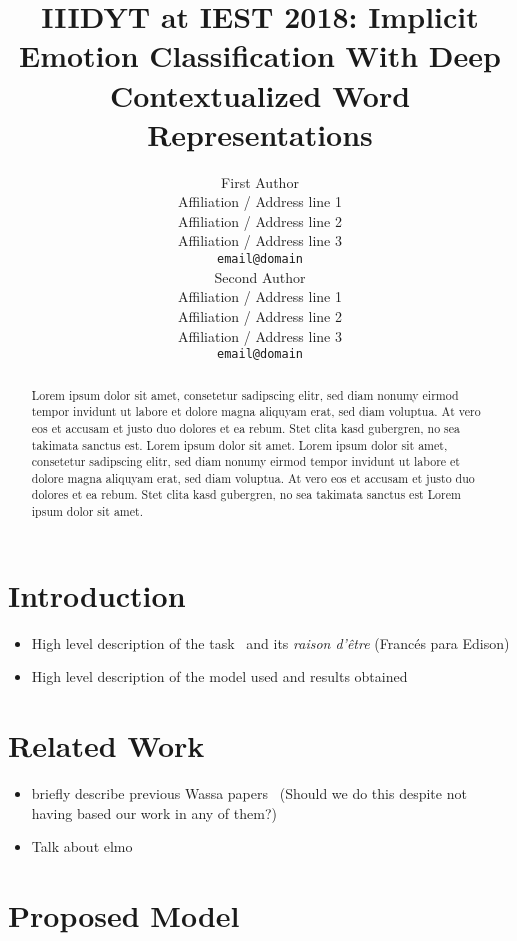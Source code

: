 \documentclass[11pt,a4paper]{article}
\title{IIIDYT at IEST 2018: Implicit Emotion Classification With Deep
Contextualized Word Representations}
\author{First Author \\
  Affiliation / Address line 1 \\
  Affiliation / Address line 2 \\
  Affiliation / Address line 3 \\
  {\tt email@domain} \\
  \And{}
  Second Author \\
  Affiliation / Address line 1 \\
  Affiliation / Address line 2 \\
  Affiliation / Address line 3 \\
  {\tt email@domain} \\}
\date{}
\begin{document}
\maketitle
\begin{abstract}

Lorem ipsum dolor sit amet, consetetur sadipscing elitr, sed diam nonumy eirmod
tempor invidunt ut labore et dolore magna aliquyam erat, sed diam voluptua. At
vero eos et accusam et justo duo dolores et ea rebum. Stet clita kasd gubergren,
no sea takimata sanctus est. Lorem ipsum dolor sit amet. Lorem ipsum dolor sit
amet, consetetur sadipscing elitr, sed diam nonumy eirmod tempor invidunt ut
labore et dolore magna aliquyam erat, sed diam voluptua. At vero eos et accusam
et justo duo dolores et ea rebum. Stet clita kasd gubergren, no sea takimata
sanctus est Lorem ipsum dolor sit amet.

\end{abstract}

\section{Introduction}
\begin{itemize}
    \item High level description of the task~\cite{klinger2018iest} and its \textit{raison d'être}
        (Francés para Edison)
    \item High level description of the model used and results obtained
\end{itemize}

\section{Related Work}
\begin{itemize}
    \item briefly describe previous Wassa papers~\cite{baziotis2018ntua,
        duppada2018seernet, abdou2018affecthor} (Should we do this despite not
        having based our work in any of them?)
    \item Talk about elmo~\cite{peters2018deep}
\end{itemize}

\section{Proposed Model}
\end{document}

